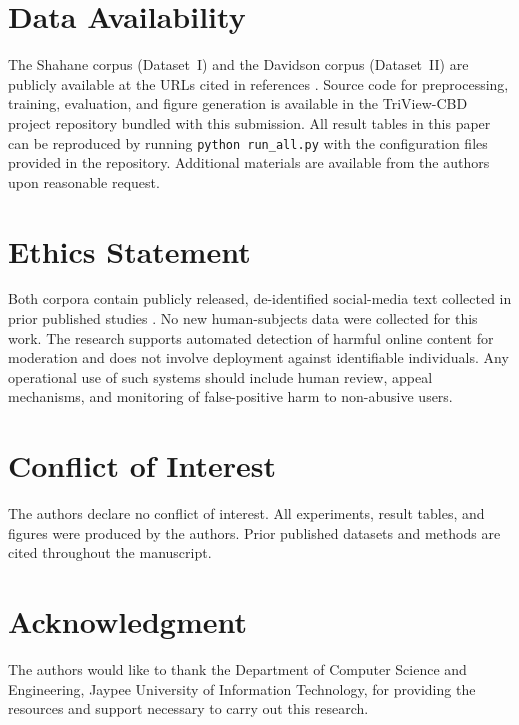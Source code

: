 \documentclass[journal]{IEEEtran}
\begin{document}
\section*{Data Availability}
The Shahane corpus (Dataset~I) and the Davidson corpus (Dataset~II) are publicly available at the URLs cited in references \cite{ref10, ref11}. Source code for preprocessing, training, evaluation, and figure generation is available in the TriView-CBD project repository bundled with this submission. All result tables in this paper can be reproduced by running \texttt{python run\_all.py} with the configuration files provided in the repository. Additional materials are available from the authors upon reasonable request.

\section*{Ethics Statement}
Both corpora contain publicly released, de-identified social-media text collected in prior published studies \cite{ref10, ref11}. No new human-subjects data were collected for this work. The research supports automated detection of harmful online content for moderation and does not involve deployment against identifiable individuals. Any operational use of such systems should include human review, appeal mechanisms, and monitoring of false-positive harm to non-abusive users.

\section*{Conflict of Interest}
The authors declare no conflict of interest. All experiments, result tables, and figures were produced by the authors. Prior published datasets and methods are cited throughout the manuscript.


\section*{Acknowledgment}
The authors would like to thank the Department of Computer Science and Engineering, Jaypee University of Information Technology, for providing the resources and support necessary to carry out this research.
\end{document}
